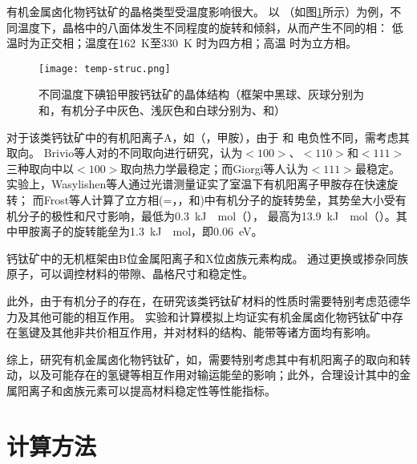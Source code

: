 有机金属卤化物钙钛矿的晶格类型受温度影响很大。
以 （如图\ref{fig:temp-struc}所示）为例，不同温度下，晶格中的八面体发生不同程度的旋转和倾斜，从而产生不同的相：
低温时为正交相；温度在\SI{162}{K}至\SI{330}{K} 时为四方相；高温 时为立方相。

\begin{figure}[htbp]
    \centering
    \texttt{[image: temp-struc.png]}
    \caption{不同温度下碘铅甲胺钙钛矿的晶体结构（框架中黑球、灰球分别为和，有机分子中灰色、浅灰色和白球分别为、和）}
    \label{fig:temp-struc}
\end{figure}

对于该类钙钛矿中的有机阳离子A，如（，甲胺），由于 和 电负性不同，需考虑其取向。
Brivio等人对的不同取向进行研究，认为$<100>$、$<110>$和$<111>$三种取向中以$<100>$取向热力学最稳定；而Giorgi等人认为$<111>$最稳定。
实验上，Wasylishen等人通过光谱测量证实了室温下有机阳离子甲胺存在快速旋转；
而Frost等人计算了立方相(=，，和)中有机分子的旋转势垒，其势垒大小受有机分子的极性和尺寸影响，最低为\SI{0.3}{kJ \per \mole}（）， 最高为\SI{13.9}{kJ \per \mole}（）。其中甲胺离子的旋转能垒为\SI{1.3}{kJ \per \mole}，即\SI{0.06}{eV}。

钙钛矿中的无机框架由B位金属阳离子和X位卤族元素构成。
通过更换或掺杂同族原子，可以调控材料的带隙、晶格尺寸和稳定性。

此外，由于有机分子的存在，在研究该类钙钛矿材料的性质时需要特别考虑范德华力及其他可能的相互作用。
实验和计算模拟上均证实有机金属卤化物钙钛矿中存在氢键及其他非共价相互作用，并对材料的结构、能带等诸方面均有影响。

综上，研究有机金属卤化物钙钛矿，如，需要特别考虑其中有机阳离子的取向和转动，以及可能存在的氢键等相互作用对输运能垒的影响；此外，合理设计其中的金属阳离子和卤族元素可以提高材料稳定性等性能指标。

\section{计算方法}

